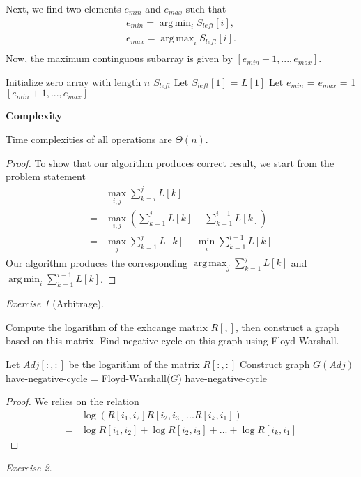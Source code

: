 \documentclass[a4paper,10pt,twoside]{article}
\DeclareMathOperator*{\argmin}{arg\,min}
\DeclareMathOperator*{\argmax}{arg\,max}
\theoremstyle{plain}
\theoremstyle{definition}
\theoremstyle{remark}
\newtheorem{exercise}{Exercise}
\begin{document}
Next, we find two elements $e_{min}$ and $e_{max}$ such that
\[
\begin{aligned}
	e_{min} = \argmin_i S_{left}[i],\\
	e_{max} = \argmax_i S_{left}[i].\\
\end{aligned}
\]
Now, the maximum continguous subarray is given by $[e_{min}+1,...,e_{max}]$.

\begin{algorithm}[H]
\caption{Find maximum contiguous array(L)}
Initialize zero array with length $n$ $S_{left}$\;
Let $S_{left}[1]$ = $L[1]$\;
Let $e_{min}$ = $e_{max}$ = 1\;
\Return $[e_{min} +1, ..., e_{max}]$
\end{algorithm}

\textbf{Complexity}

Time complexities of all operations are $\Theta(n)$.

\begin{proof}
To show that our algorithm produces correct result, we start from the
problem statement
\[
	\begin{aligned}
	&\max_{i, j} \sum_{k=i}^j L[k] \\
	=&\max_{i, j} \left( \sum_{k=1}^j L[k] - \sum_{k=1}^{i-1} L[k] \right)\\
	=&\max_{j} \sum_{k=1}^j L[k] - \min_{i}\sum_{k=1}^{i-1} L[k] 
	\end{aligned}
\]
Our algorithm produces the corresponding $\argmax_j\sum_{k=1}^j L[k]$ 
and $\argmin_i\sum_{k=1}^{i-1} L[k]$.
\end{proof}
\begin{exercise}[Arbitrage]\

Compute the logarithm of the exhcange matrix $R[,]$, then construct
a graph based on this matrix. Find negative cycle on this graph 
using Floyd-Warshall.


\begin{algorithm}[H]
\caption{Check for negative Arbitrage($R[:, :]$)}
\label{algo:negative-arbitrage}
	Let $Adj[:, :]$ be the logarithm of the matrix $R[:,:]$\;
	Construct graph $G(Adj)$\;
	have-negative-cycle = Floyd-Warshall($G$)\;
	\Return have-negative-cycle
\end{algorithm}

\begin{proof}
We relies on the relation
\[
\begin{aligned}
&\log (R[i_1, i_2]R[i_2, i_3]...R[i_k, i_1])\\
=&\log R[i_1, i_2] + \log R[i_2, i_3] + ... + \log R[i_k, i_1]
\end{aligned}
\]
\end{proof}
\end{exercise}	
\begin{exercise}
\end{exercise}
\end{document}
